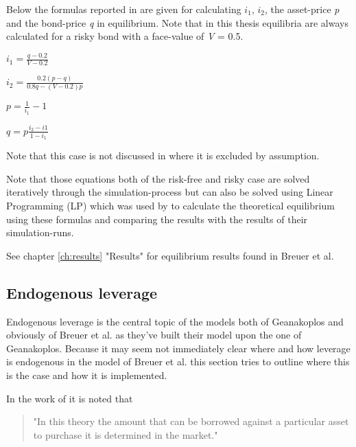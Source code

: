 \documentclass[../Bachelorarbeit.tex]{subfiles}
\begin{document}
Below the formulas reported in \cite{Breuer2015} are given for calculating $i_{1}$, $i_{2}$, the asset-price \textit{p} and the bond-price \textit{q} in equilibrium. Note that in this thesis equilibria are always calculated for a risky bond with a face-value of \textit{V} = 0.5.

\begin{center}
$i_{1} = \frac{q - 0.2}{V - 0.2}$
\end{center}

\begin{center}
$i_{2} = \frac{0.2(p - q)}{0.8q - (V - 0.2)p}$
\end{center}

\begin{center}
$p = \frac{1}{i_{1}} - 1$
\end{center}

\begin{center}
$q = p \frac{i_{2} - i{1}}{1 - i_{1}}$
\end{center}

Note that this case is not discussed in \cite{Geanakoplos2009} where it is excluded by assumption.

\medskip

Note that those equations both of the risk-free and risky case are solved iteratively through the simulation-process but can also be solved using Linear Programming (LP) which was used by \cite{Breuer2015} to calculate the theoretical equilibrium using these formulas and comparing the results with the results of their simulation-runs.

\medskip

See chapter \ref{ch:results} "Results" for equilibrium results found in Breuer et al.

\subsection{Endogenous leverage}
Endogenous leverage is the central topic of the models both of Geanakoplos and obviously of Breuer et al. as they've built their model upon the one of Geanakoplos. Because it may seem not immediately clear where and how leverage is endogenous in the model of Breuer et al. this section tries to outline where this is the case and how it is implemented. 

\medskip
In the work of \cite{Breuer2015} it is noted that 
\begin{quote}
"In this theory the amount that can be borrowed against a particular asset to purchase it is determined in the market."
\end{quote}
\end{document}
